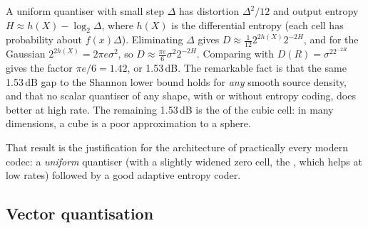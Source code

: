 \begin{deeper}
A uniform quantiser with small step $\Delta$ has distortion $\Delta^2/12$ and output entropy
$H\approx h(X)-\log_2\Delta$, where $h(X)$ is the differential entropy (each cell has probability
about $f(x)\Delta$). Eliminating $\Delta$ gives $D\approx\frac{1}{12}2^{2h(X)}2^{-2H}$, and for the
Gaussian $2^{2h(X)}=2\pi e\sigma^2$, so $D\approx\frac{\pi e}{6}\sigma^2 2^{-2H}$. Comparing with
$D(R)=\sigma^22^{-2R}$ gives the factor $\pi e/6=1.42$, or 1.53\,dB. The remarkable fact is that the
same 1.53\,dB gap to the Shannon lower bound holds for \emph{any} smooth source density, and that no
scalar quantiser of any shape, with or without entropy coding, does better at high rate. The
remaining 1.53\,dB is the  of the cubic cell: in many dimensions, a cube
is a poor approximation to a sphere.
\end{deeper}

That result is the justification for the architecture of practically every modern codec: a
\emph{uniform} quantiser (with a slightly widened zero cell, the , which helps at low
rates) followed by a good adaptive entropy coder.

\subsection{Vector quantisation}



